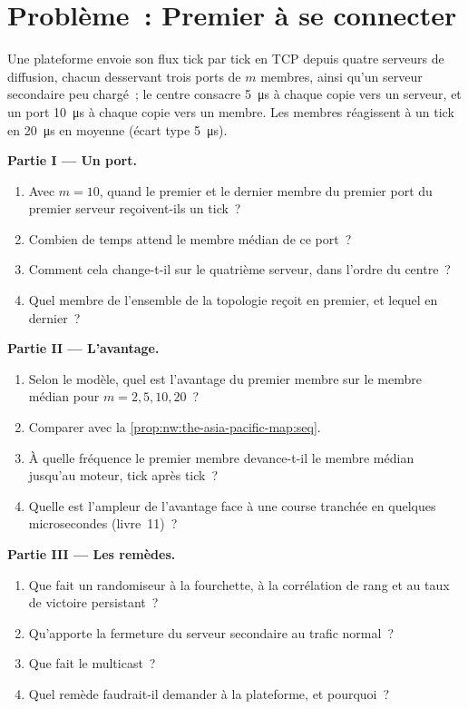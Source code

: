\section{Problème~: Premier à se connecter}

\begin{problem}\label{pb:nw:the-asia-pacific-map:1}
Une plateforme envoie son flux tick par tick en TCP depuis quatre serveurs de diffusion, chacun desservant trois ports de $m$ membres, ainsi qu'un serveur secondaire
peu chargé~; le centre consacre \qty{5}{\micro\second} à chaque copie vers un serveur, et un port \qty{10}{\micro\second} à chaque copie vers un membre. Les membres réagissent
à un tick en \qty{20}{\micro\second} en moyenne (écart type \qty{5}{\micro\second}).

\medskip\noindent\textbf{Partie I --- Un port.}
\begin{enumerate}
\item Avec $m = 10$, quand le premier et le dernier membre du premier port du premier serveur reçoivent-ils un tick~?
\item Combien de temps attend le membre médian de ce port~?
\item Comment cela change-t-il sur le quatrième serveur, dans l'ordre du centre~?
\item Quel membre de l'ensemble de la topologie reçoit en premier, et lequel en dernier~?
\end{enumerate}

\medskip\noindent\textbf{Partie II --- L'avantage.}
\begin{enumerate}[resume]
\item Selon le modèle, quel est l'avantage du premier membre sur le membre médian pour $m = 2, 5, 10, 20$~?
\item Comparer avec la \cref{prop:nw:the-asia-pacific-map:seq}.
\item À quelle fréquence le premier membre devance-t-il le membre médian jusqu'au moteur, tick après tick~?
\item Quelle est l'ampleur de l'avantage face à une course tranchée en quelques microsecondes (livre~11)~?
\end{enumerate}

\medskip\noindent\textbf{Partie III --- Les remèdes.}
\begin{enumerate}[resume]
\item Que fait un randomiseur à la fourchette, à la corrélation de rang et au taux de victoire persistant~?
\item Qu'apporte la fermeture du serveur secondaire au trafic normal~?
\item Que fait le multicast~?
\item Quel remède faudrait-il demander à la plateforme, et pourquoi~?
\end{enumerate}


\end{problem}
